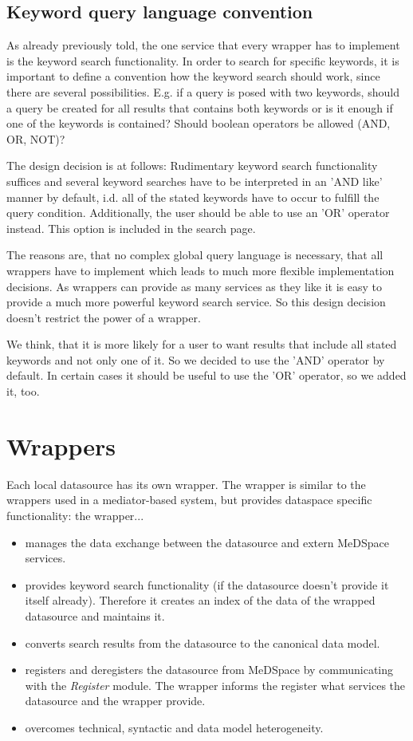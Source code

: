 \subsection{Keyword query language convention}
As already previously told, the one service that every wrapper has to implement is the keyword search functionality. In order to search for specific keywords, it is important to define a convention how the keyword search should work, since there are several possibilities. E.g. if a query is posed with two keywords, should a query be created for all results that contains both keywords or is it enough if one of the keywords is contained? Should boolean operators be allowed (AND, OR, NOT)? 

The design decision is at follows: Rudimentary keyword search functionality suffices and several keyword searches have to be interpreted in an 'AND like' manner by default, i.d. all of the stated keywords have to occur to fulfill the query condition. Additionally, the user should be able to use an 'OR' operator instead. This option is included in the search page.

The reasons are, that no complex global query language is necessary, that all wrappers have to implement which leads to much more flexible implementation decisions. As wrappers can provide as many services as they like it is easy to provide a much more powerful keyword search service. So this design decision doesn't restrict the power of a wrapper.

We think, that it is more likely for a user to want results that include all stated keywords and not only one of it. So we decided to use the 'AND' operator by default. In certain cases it should be useful to use the 'OR' operator, so we added it, too.

\section{Wrappers}
Each local datasource has its own wrapper. The wrapper is similar to the wrappers used in a mediator-based system, but provides dataspace specific functionality: the wrapper...
\begin{itemize}
	\item manages the data exchange between the datasource and extern MeDSpace services.
	\item provides keyword search functionality (if the datasource doesn't provide it itself already). Therefore it creates an index of the data of the wrapped datasource and maintains it. 	
	\item converts search results from the datasource to the canonical data model.
	\item registers and deregisters the datasource from MeDSpace by communicating with the \emph{Register} module. The wrapper informs the register what services the datasource and the wrapper provide.
	\item overcomes technical, syntactic and data model heterogeneity. 
\end{itemize}

